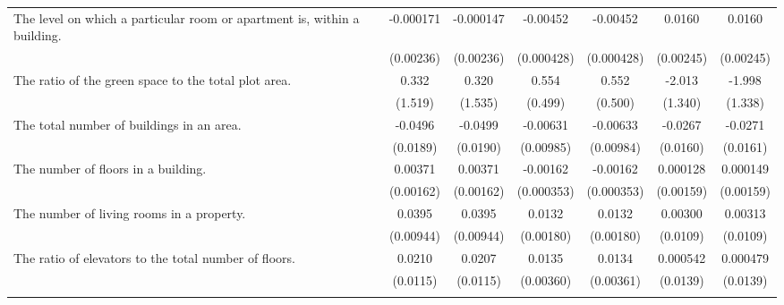 {\begin{tabular}{l*{6}{c}}
\addlinespace
The level on which a particular room or apartment is, within a building.&   -0.000171         &   -0.000147         &    -0.00452\sym{***}&    -0.00452\sym{***}&      0.0160\sym{***}&      0.0160\sym{***}\\
                    &   (0.00236)         &   (0.00236)         &  (0.000428)         &  (0.000428)         &   (0.00245)         &   (0.00245)         \\
\addlinespace
The ratio of the green space to the total plot area.&       0.332         &       0.320         &       0.554         &       0.552         &      -2.013         &      -1.998         \\
                    &     (1.519)         &     (1.535)         &     (0.499)         &     (0.500)         &     (1.340)         &     (1.338)         \\
\addlinespace
The total number of buildings in an area.&     -0.0496\sym{***}&     -0.0499\sym{***}&    -0.00631         &    -0.00633         &     -0.0267\sym{*}  &     -0.0271\sym{*}  \\
                    &    (0.0189)         &    (0.0190)         &   (0.00985)         &   (0.00984)         &    (0.0160)         &    (0.0161)         \\
\addlinespace
The number of floors in a building.&     0.00371\sym{**} &     0.00371\sym{**} &    -0.00162\sym{***}&    -0.00162\sym{***}&    0.000128         &    0.000149         \\
                    &   (0.00162)         &   (0.00162)         &  (0.000353)         &  (0.000353)         &   (0.00159)         &   (0.00159)         \\
\addlinespace
The number of living rooms in a property.&      0.0395\sym{***}&      0.0395\sym{***}&      0.0132\sym{***}&      0.0132\sym{***}&     0.00300         &     0.00313         \\
                    &   (0.00944)         &   (0.00944)         &   (0.00180)         &   (0.00180)         &    (0.0109)         &    (0.0109)         \\
\addlinespace
The ratio of elevators to the total number of floors.&      0.0210\sym{*}  &      0.0207\sym{*}  &      0.0135\sym{***}&      0.0134\sym{***}&    0.000542         &    0.000479         \\
                    &    (0.0115)         &    (0.0115)         &   (0.00360)         &   (0.00361)         &    (0.0139)         &    (0.0139)         \\
\addlinespace

\end{tabular}}
